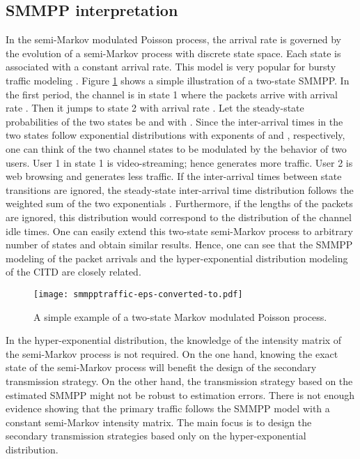 \documentclass[10pt,final,journal,letterpaper]{IEEEtran}
\begin{document}
\subsection{SMMPP interpretation}\label{sec:3a}
In the semi-Markov modulated Poisson process, the arrival rate is governed by the evolution of a semi-Markov process with discrete state space. Each state is associated with a constant arrival rate. This model is very popular for bursty traffic modeling \cite{heffes1986markov, leland1994self}. Figure \ref{fig:smmpptraffic} shows a simple illustration of a two-state SMMPP. In the first period, the channel is in state 1 where the packets arrive with arrival rate . Then it jumps to state 2 with arrival rate . Let the steady-state probabilities of the two states be  and  with . Since the inter-arrival times in the two states follow exponential distributions with exponents of  and , respectively, one can think of the two channel states to be modulated by the behavior of two users. User 1 in state 1 is video-streaming; hence generates more traffic. User 2 is web browsing and generates less traffic. If the inter-arrival times between state transitions are ignored, the steady-state inter-arrival time distribution follows the weighted sum of the two exponentials . Furthermore, if the lengths of the packets are ignored, this distribution would correspond to the distribution of the channel idle times. One can easily extend this two-state semi-Markov process to arbitrary number of states and obtain similar results. Hence, one can see that the SMMPP modeling of the packet arrivals and the hyper-exponential distribution modeling of the CITD are closely related.
\begin{figure}[!h]
\centering
\texttt{[image: smmpptraffic-eps-converted-to.pdf]}
\caption{A simple example of a two-state Markov modulated Poisson process.}
\label{fig:smmpptraffic}
\end{figure}

\par
In the hyper-exponential distribution, the knowledge of the intensity matrix of the semi-Markov process is not required. On the one hand, knowing the exact state of the semi-Markov process will benefit the design of the secondary transmission strategy. On the other hand, the transmission strategy based on the estimated SMMPP might not be robust to estimation errors. There is not enough evidence showing that the primary traffic follows the SMMPP model with a constant semi-Markov intensity matrix. The main focus is to design the secondary transmission strategies based only on the hyper-exponential distribution.
\end{document}
